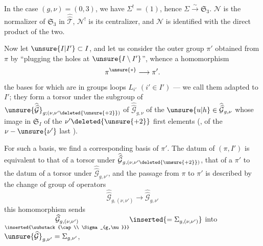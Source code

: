 In the case $(g,\nu)=(0,3)$, we have $\Sigma^!=(1)$, \unsure{$\Rightarrow$} hence $\Sigma\xrightarrow{\sim}\mathfrak S_3$. $\mathcal N$ is the  normalizer of $\mathfrak S_3$ in $\widehat{\widehat{\mathcal T}}$, $\mathcal N^!$ \inserted{$\unsure{\xrightarrow{\sim}}\Gamma_\Sigma$} is its centralizer, and $\mathcal N$ is identified with the direct product of the two.


Now let $\unsure{I|I'}\subset I$,  and let us consider the outer group $\pi'$ obtained from $\pi$ by ``plugging the holes at $\unsure{I\setminus I'}$'', whence a homomorphism
\[
\pi^{\unsure{*}}\longrightarrow\pi'.
\]
  the bases  for which    are in  groups  loops  $L_{i'}$ $(i'\in I')$ --- we call them adapted to $I'$; they form a torsor  under the subgroup of  $\unsure{\widehat{\widehat{\mathcal G}}}_{g;(\nu,\nu'\deleted{\unsure{+2}})}$ of $\widehat{\widehat{\mathcal G}}_{g,\nu}$   of the $\unsure{u|h}\in\widehat{\widehat{\mathcal G}}_{g,\nu}$ whose image in $\mathfrak S_I$   of the $\nu'\deleted{\unsure{+2}}$ first elements (, of the $\nu-\unsure{\nu'}$ last ).


For such a basis, we find a corresponding basis of $\pi'$.  The datum of $(\pi,I')$ is equivalent to that of a torsor under $\widehat{\widehat{\mathcal G}}_{g,(\nu,\nu'\deleted{\unsure{+2}})}$, that of a $\pi'$ to  the datum of a torsor under $\widehat{\widehat{\mathcal G}}_{g,\nu'}$, and the passage from $\pi$ to $\pi'$ is described by the change of group of operators
\[
\widehat{\widehat{\mathcal G}}_{g,(\nu,\nu')}\longrightarrow\widehat{\widehat{\mathcal G}}_{g,\nu'}
\]
this homomorphism sends $\underset{\inserted{\substack{\cap\\ \Sigma_{g,\nu}}}}{\widehat{\mathcal G}_{g,(\nu,\nu')}}\inserted{=\Sigma_{g,(\nu,\nu')}}$ into $\unsure{\widehat{\mathcal G}}_{g,\nu'}=\Sigma_{g,\nu'}$,

